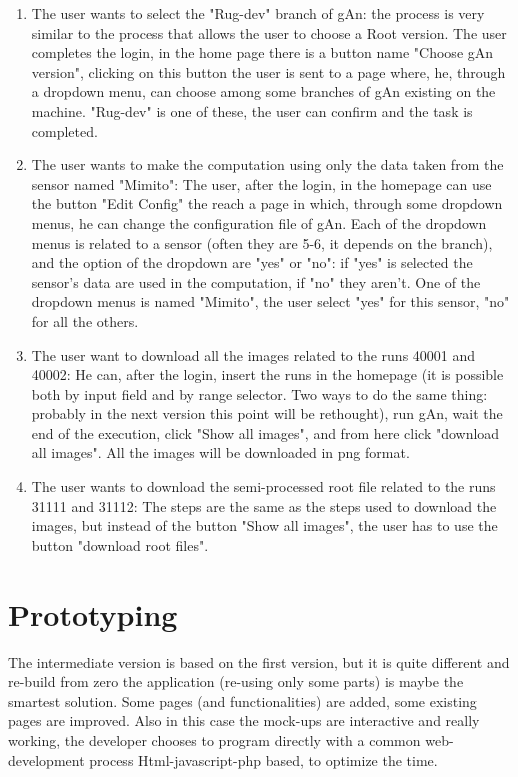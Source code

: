 \begin{enumerate}
\item The user wants to select the "Rug-dev" branch of gAn:
the process is very similar to the process that allows the user to choose a Root version. The user completes the login, in the home page there is a button name "Choose gAn version", clicking on this button the user is sent to a page where, he, through a dropdown menu, can choose among some branches of gAn existing on the machine. "Rug-dev" is one of these, the user can confirm and the task is completed.

\item The user wants to make the computation using only the data taken from the sensor named "Mimito":
The user, after the login, in the homepage can use the button "Edit Config" the reach a page in which, through some dropdown menus, he can change the configuration file of gAn. Each of the dropdown menus is related to a sensor (often they are 5-6, it depends on the branch), and the option of the dropdown are "yes" or "no": if "yes" is selected the sensor's data are used in the computation, if "no" they aren't. One of the dropdown menus is named "Mimito", the user select "yes" for this sensor, "no" for all the others.  

\item The user want to download all the images related to the runs 40001 and 40002:
He can, after the login, insert the runs in the homepage (it is possible both by input field and by range selector. Two ways to do the same thing: probably in the next version this point will be rethought), run gAn, wait the end of the execution, click "Show all images", and from here click "download all images". All the images will be downloaded in png format.

\item The user wants to download the semi-processed root file related to the runs 31111 and 31112:
The steps are the same as the steps used to download the images, but instead of the button "Show all images", the user has to use the button "download root files".     

\end{enumerate}  


\section{Prototyping}

The intermediate version is based on the first version, but it is quite different and re-build from zero the application (re-using only some parts) is maybe the smartest solution. Some pages (and functionalities) are added, some existing pages are improved. 
Also in this case the mock-ups are interactive and really working, the developer chooses to program directly with a common web-development process Html-javascript-php based, to optimize the time.

